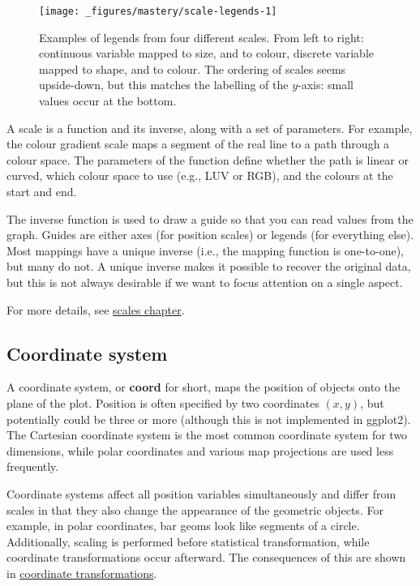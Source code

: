 \begin{figure}[H]
  \texttt{[image: \_figures/mastery/scale-legends-1]}
  \caption{Examples of legends from four different scales. From left to right: continuous variable mapped to size, and to colour, discrete variable mapped to shape, and to colour. The ordering of scales seems upside-down, but this matches the labelling of the $y$-axis: small values occur at the bottom.}
  \label{fig:scale-legends}
\end{figure}

A scale is a function and its inverse, along with a set of parameters.
For example, the colour gradient scale maps a segment of the real line
to a path through a colour space. The parameters of the function define
whether the path is linear or curved, which colour space to use (e.g.,
LUV or RGB), and the colours at the start and end.

The inverse function is used to draw a guide so that you can read values
from the graph. Guides are either axes (for position scales) or legends
(for everything else). Most mappings have a unique inverse (i.e., the
mapping function is one-to-one), but many do not. A unique inverse makes
it possible to recover the original data, but this is not always
desirable if we want to focus attention on a single aspect.

For more details, see \protect\hyperlink{cha:scales}{scales chapter}.

\subsection{Coordinate system}\label{sub:coordinate-systems}

A coordinate system, or \textbf{coord} for short, maps the position of
objects onto the plane of the plot. Position is often specified by two
coordinates \((x, y)\), but potentially could be three or more (although
this is not implemented in ggplot2). The Cartesian coordinate system is
the most common coordinate system for two dimensions, while polar
coordinates and various map projections are used less frequently.

Coordinate systems affect all position variables simultaneously and
differ from scales in that they also change the appearance of the
geometric objects. For example, in polar coordinates, bar geoms look
like segments of a circle. Additionally, scaling is performed before
statistical transformation, while coordinate transformations occur
afterward. The consequences of this are shown in
\protect\hyperlink{sub:coord-non-linear}{coordinate transformations}.

